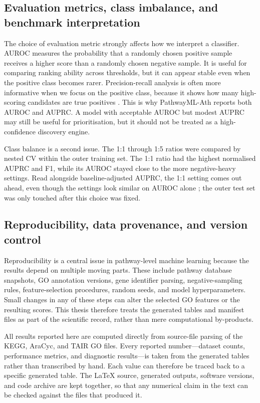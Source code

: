 \documentclass[12pt,twoside]{article}
\begin{document}
\subsection{Evaluation metrics, class imbalance, and benchmark interpretation}
\label{sec:lit_metrics}

The choice of evaluation metric strongly affects how we interpret a classifier. AUROC measures the probability that a randomly chosen positive sample receives a higher score than a randomly chosen negative sample. It is useful for comparing ranking ability across thresholds, but it can appear stable even when the positive class becomes rarer. Precision-recall analysis is often more informative when we focus on the positive class, because it shows how many high-scoring candidates are true positives \citep{saito2015precision}. This is why PathwayML-Ath reports both AUROC and AUPRC. A model with acceptable AUROC but modest AUPRC may still be useful for prioritisation, but it should not be treated as a high-confidence discovery engine.

Class balance is a second issue. The 1:1 through 1:5 ratios were compared by nested CV within the outer training set. The 1:1 ratio had the highest normalised AUPRC and F1, while its AUROC stayed close to the more negative-heavy settings. Read alongside baseline-adjusted AUPRC, the 1:1 setting comes out ahead, even though the settings look similar on AUROC alone \citep{saito2015precision}; the outer test set was only touched after this choice was fixed.

\subsection{Reproducibility, data provenance, and version control}
\label{sec:lit_reproducibility}

Reproducibility is a central issue in pathway-level machine learning because the results depend on multiple moving parts. These include pathway database snapshots, GO annotation versions, gene identifier parsing, negative-sampling rules, feature-selection procedures, random seeds, and model hyperparameters. Small changes in any of these steps can alter the selected GO features or the resulting scores. This thesis therefore treats the generated tables and manifest files as part of the scientific record, rather than mere computational by-products.

All results reported here are computed directly from source-file parsing of the KEGG, AraCyc, and TAIR GO files. Every reported number---dataset counts, performance metrics, and diagnostic results---is taken from the generated tables rather than transcribed by hand. Each value can therefore be traced back to a specific generated table. The LaTeX source, generated outputs, software versions, and code archive are kept together, so that any numerical claim in the text can be checked against the files that produced it.
\end{document}
